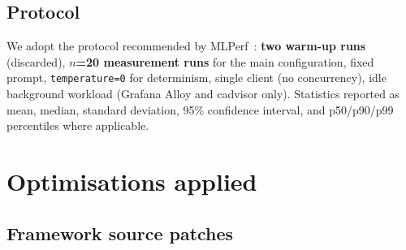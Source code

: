 \documentclass[11pt,a4paper]{article}
\begin{document}
\subsection{Protocol}

We adopt the protocol recommended by MLPerf~\cite{mlperf2025}: \textbf{two warm-up runs} (discarded), \textbf{$n$=20 measurement runs} for the main configuration, fixed prompt, \texttt{temperature=0} for determinism, single client (no concurrency), idle background workload (Grafana Alloy and cadvisor only). Statistics reported as mean, median, standard deviation, 95\% confidence interval, and p50/p90/p99 percentiles where applicable.

\section{Optimisations applied}
\label{sec:patches}

\subsection{Framework source patches}
\end{document}

